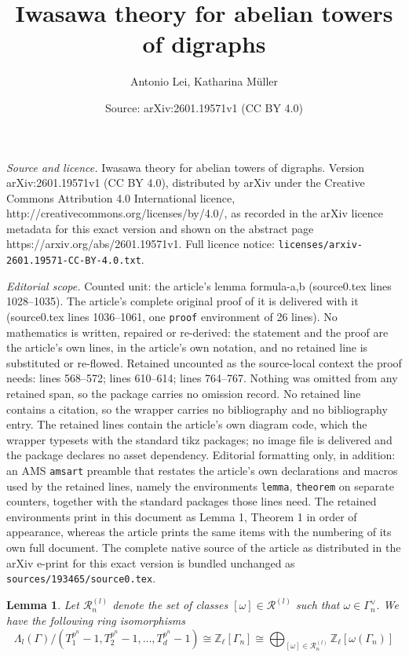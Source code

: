 \documentclass[10pt,a4paper]{amsart}
\title{Iwasawa theory for abelian towers of digraphs}
\author{Antonio Lei, Katharina M\"uller}
\date{Source: arXiv:2601.19571v1 (CC BY 4.0)}
\newtheorem{lemma}{Lemma}
\newcommand{\ZZ}{\mathbb{Z}}
\newcommand{\Zl}{\ZZ_\ell}
\newcommand{\sR}{\mathscr{R}}
\begin{document}
\maketitle

\noindent\emph{Source and licence.} Iwasawa theory for abelian towers of digraphs. Version arXiv:2601.19571v1 (CC BY 4.0), distributed by arXiv under the Creative Commons Attribution 4.0 International licence, http://creativecommons.org/licenses/by/4.0/, as recorded in the arXiv licence metadata for this exact version and shown on the abstract page https://arxiv.org/abs/2601.19571v1. Full licence notice: \texttt{licenses/arxiv-2601.19571-CC-BY-4.0.txt}.\par\smallskip

\noindent\textit{Editorial scope.} Counted unit: the article's lemma formula-a,b (source0.tex lines 1028--1035). The article's complete original proof of it is delivered with it (source0.tex lines 1036--1061, one \texttt{proof} environment of 26 lines). No mathematics is written, repaired or re-derived: the statement and the proof are the article's own lines, in the article's own notation, and no retained line is substituted or re-flowed.  Retained uncounted as the source-local context the proof needs: lines 568--572; lines 610--614; lines 764--767.  Nothing was omitted from any retained span, so the package carries no omission record.  No retained line contains a citation, so the wrapper carries no bibliography and no bibliography entry.  The retained lines contain the article's own diagram code, which the wrapper typesets with the standard tikz packages; no image file is delivered and the package declares no asset dependency.  Editorial formatting only, in addition: an AMS \texttt{amsart} preamble that restates the article's own declarations and macros used by the retained lines, namely the environments \texttt{lemma}, \texttt{theorem} on separate counters, together with the standard packages those lines need.  The retained environments print in this document as Lemma 1, Theorem 1 in order of appearance, whereas the article prints the same items with the numbering of its own full document.  The complete native source of the article as distributed in the arXiv e-print for this exact version is bundled unchanged as \texttt{sources/193465/source0.tex}.
\begin{lemma}
\label{isomorphism-group rings}
Let  $\sR_n^{(l)}$ denote the set of classes $[\omega]\in\sR^{(l)}$ such that $\omega\in\Gamma_n^\vee$.     We have the following ring isomorphisms
    \[\Lambda_l(\Gamma)/(T_1^{p^n}-1,T_2^{p^n}-1,\dots , T_d^{p^n}-1)\cong\Zl[\Gamma_n]\cong \bigoplus_{[\omega]\in\sR_n^{(l)}}\Zl[\omega(\Gamma_n)]  \]
   \end{lemma}
\end{document}
